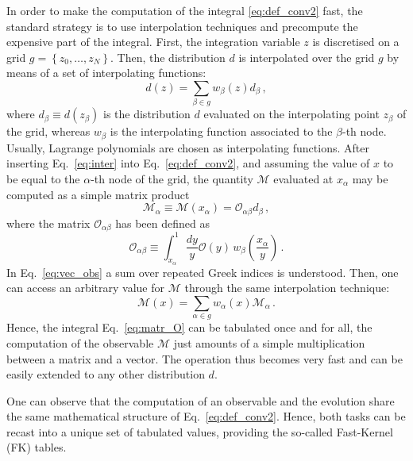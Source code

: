 In order to make the computation of the integral \eqref{eq:def_conv2} fast, the standard strategy is to use interpolation techniques and precompute the expensive part of the integral. First, the integration variable $z$ is discretised on a grid $g=\left\{ z_0,\dots, z_N\right\}$. Then, the distribution $d$ is interpolated over the grid $g$ by means of a set of interpolating functions:
\begin{equation}
  d(z) = \sum_{\beta \in g} w_{\beta}(z) d_{\beta} \,,
  \label{eq:inter}
\end{equation}
where $d_{\beta} \equiv d(z_{\beta})$ is the distribution $d$ evaluated on the interpolating point $z_{\beta}$ of the grid, whereas $w_{\beta}$ is the interpolating function associated to the $\beta$-th node. Usually, Lagrange polynomials are chosen as interpolating functions. After inserting Eq.~\eqref{eq:inter} into Eq.~\eqref{eq:def_conv2}, and assuming the value of $x$ to be equal to the $\alpha$-th node of the grid, the quantity $\mathcal{M}$ evaluated at $x_{\alpha}$ may be computed as a simple matrix product
\begin{equation}
  \mathcal{M}_{\alpha} \equiv \mathcal{M}(x_{\alpha}) = \mathcal{O}_{\alpha \beta} d_{\beta} \,,
  \label{eq:vec_obs}
\end{equation}
where the matrix $\mathcal{O}_{\alpha \beta}$ has been defined as
\begin{equation}
  \mathcal{O}_{\alpha \beta} \equiv \int_{x_{\alpha}}^{1} \frac{dy}{y} \mathcal{O}(y) \, w_{\beta} \left( \frac{x_{\alpha}}{y}  \right) \,.
  \label{eq:matr_O}
\end{equation}
In Eq.~\eqref{eq:vec_obs} a sum over repeated Greek indices is understood. Then, one can access an arbitrary value for $\mathcal{M}$ through the same interpolation technique:
\begin{equation}
  \mathcal{M}(x) = \sum_{\alpha \in g} w_{\alpha}(x) \mathcal{M}_{\alpha} \,.
\end{equation}
Hence, the integral Eq.~\eqref{eq:matr_O} can be tabulated once and for all, the computation of the observable $\mathcal{M}$ just amounts of a simple multiplication between a matrix and a vector. The operation thus becomes very fast and can be easily extended to any other distribution $d$.%

One can observe that the computation of an observable and the evolution share the same mathematical structure of Eq.~\eqref{eq:def_conv2}. Hence, both tasks can be recast into a unique set of tabulated values, providing the so-called Fast-Kernel (FK) tables.

